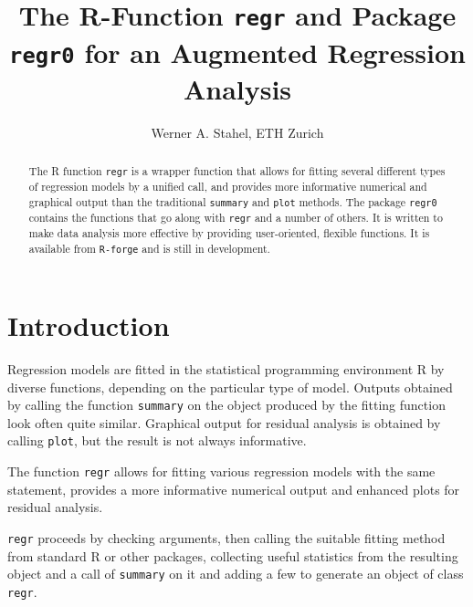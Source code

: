 \documentclass[11pt]{article}
\providecommand{\T}{\texttt}
\begin{document}


\title{\vspace*{-10mm}
The R-Function \T{regr} and Package \T{regr0} for an Augmented 
Regression Analysis}
\author{Werner A. Stahel, ETH Zurich}
\maketitle

\begin{abstract}\noindent
The R function \T{regr} is a wrapper function that allows for fitting
several different types of regression models by a unified call, and
provides more informative numerical and graphical output than the 
traditional \T{summary} and \T{plot} methods.
The package \T{regr0} contains the functions that go along with 
\T{regr} and a number of others.
It is written to make data analysis more effective by providing
user-oriented, flexible functions.
It is available from \T{R-forge} and is still in development.
\end{abstract}

\section{Introduction}

Regression models are fitted in the statistical programming environment R 
by diverse functions, depending on the particular type of model.
Outputs obtained by calling the function \T{summary} on the object produced
by the fitting function look often quite similar. Graphical output for
residual analysis is obtained by calling \T{plot}, but the result is not
always informative. 

The function \T{regr} allows for fitting various regression models
with the same statement, provides a more informative numerical output
and enhanced plots for residual analysis. 

\T{regr} proceeds by 
checking arguments, then calling the suitable fitting method from standard
R or other packages,
collecting useful statistics from the resulting object and a call of 
\T{summary} on it and adding a few to generate an object of class
\T{regr}. 
\end{document}
